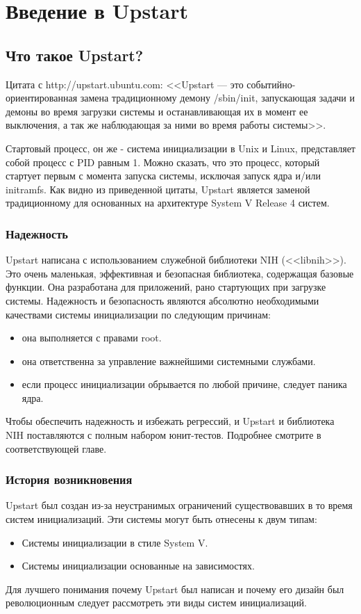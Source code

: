 \chapter{Введение в Upstart} \label{sec:Introduction}

\section{Что такое Upstart?}

Цитата с http://upstart.ubuntu.com: <<Upstart --- это событийно-ориентированная замена традиционному демону /sbin/init, запускающая задачи и демоны во время загрузки системы и останавливающая их в момент ее выключения, а так же наблюдающая за ними во время работы системы>>.

Стартовый процесс, он же - система инициализации в Unix и Linux, представляет собой процесс с PID равным 1. Можно сказать, что это процесс, который стартует первым с момента запуска системы, исключая запуск ядра и/или initramfs. Как видно из приведенной цитаты, Upstart является заменой традиционному для основанных на архитектуре System V Release 4 систем.

\subsection{Надежность}

Upstart написана с использованием служебной библиотеки NIH (<<libnih>>). Это очень маленькая, эффективная и безопасная библиотека, содержащая базовые функции. Она разработана для приложений, рано стартующих при загрузке системы. Надежность и безопасность являются абсолютно необходимыми качествами системы инициализации по следующим причинам:
\begin{itemize}
\item она выполняется с правами root.
\item она ответственна за управление важнейшими системными службами.
\item если процесс инициализации обрывается по любой причине, следует паника ядра.
\end{itemize}
Чтобы обеспечить надежность и избежать регрессий, и Upstart и библиотека NIH поставляются с полным набором юнит-тестов. Подробнее смотрите в соответствующей главе.
\subsection{История возникновения}
Upstart был создан из-за неустранимых ограничений существовавших в то время систем инициализаций. Эти системы могут быть отнесены к двум типам: \begin{itemize}
\item Системы инициализации в стиле System V.
\item Системы инициализации основанные на зависимостях.
\end{itemize}
Для лучшего понимания почему Upstart был написан и почему его дизайн был революционным следует рассмотреть эти виды систем инициализаций.
